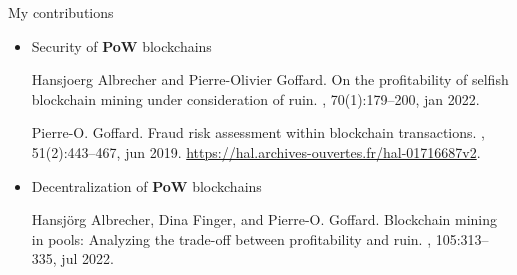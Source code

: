 \documentclass{beamer}
\begin{document}
\begin{frame}{My contributions}
\begin{itemize}
\item Security of \textbf{PoW} blockchains
\tiny
\begin{thebibliography}{1}

Hansjoerg Albrecher and Pierre-Olivier Goffard.
\newblock On the profitability of selfish blockchain mining under consideration
  of ruin.
, 70(1):179--200, jan 2022.


Pierre-O. Goffard.
\newblock Fraud risk assessment within blockchain transactions.
, 51(2):443--467, jun 2019.
\newblock \url{https://hal.archives-ouvertes.fr/hal-01716687v2}.

\end{thebibliography}
\normalsize
\item  Decentralization of \textbf{PoW} blockchains
\tiny
\begin{thebibliography}{1}
Hansjörg Albrecher, Dina Finger, and Pierre-O. Goffard.
\newblock Blockchain mining in pools: Analyzing the trade-off between
  profitability and ruin.
, 105:313--335, jul 2022.
\end{thebibliography}
\end{itemize}
\end{frame}
\end{document}
